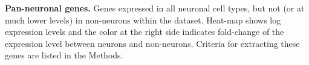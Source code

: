\textbf{Pan-neuronal genes.} 
Genes expressed in all neuronal cell types, but not (or at much lower levels) in non-neurons within the dataset. Heat-map shows log expression levels and the color at the right side indicates fold-change of the expression level between neurons and non-neurons. Criteria for extracting these genes are listed in the Methods.



